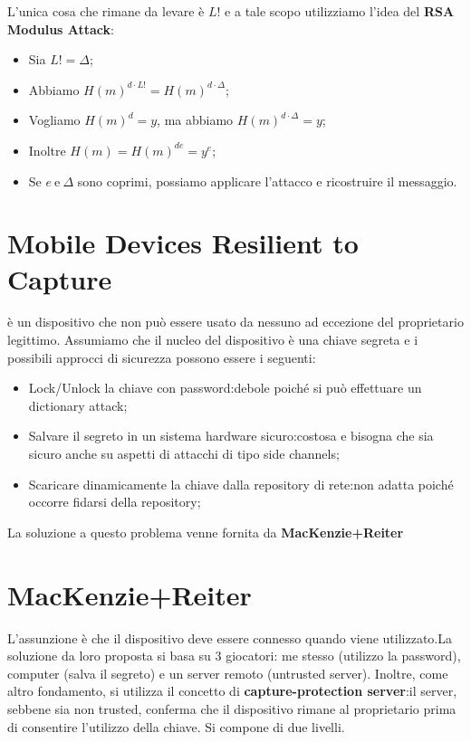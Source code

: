 \documentclass{book}
\begin{document}
L'unica cosa che rimane da levare è \(L! \) e a tale scopo utilizziamo l'idea del \textbf{RSA Modulus Attack}:\begin{itemize}
	\item Sia \(L! =\Delta \);
	\item Abbiamo \({H(m)}^{d\cdot L!}={H(m)}^{d\cdot \Delta}\);
	\item Vogliamo \({H(m)}^{d}=y\), ma abbiamo \({H(m)}^{d\cdot \Delta }=y\);
	\item Inoltre \(H(m)={H(m)}^{de}=y^{e}\);
	\item Se \(e\ \text{e}\ \Delta \) sono coprimi, possiamo applicare l'attacco e ricostruire il messaggio.
\end{itemize}
\section{Mobile Devices Resilient to Capture}
è un dispositivo che non può essere usato da nessuno ad eccezione del proprietario legittimo\@. Assumiamo che il nucleo del dispositivo è una chiave segreta e i possibili approcci di sicurezza possono essere i seguenti:\begin{itemize}
	\item Lock/Unlock la chiave con password:\@soluzione debole poiché si può effettuare un dictionary attack;
	\item Salvare il segreto in un sistema hardware sicuro:\@soluzione costosa e bisogna che sia sicuro anche su aspetti di attacchi di tipo side channels;
	\item Scaricare dinamicamente la chiave dalla repository di rete:\@soluzione non adatta poiché occorre fidarsi della repository;
\end{itemize}
La soluzione a questo problema venne fornita da \textbf{MacKenzie+Reiter}
\section{MacKenzie+Reiter}
L'assunzione è che il dispositivo deve essere connesso quando viene utilizzato\@.La soluzione da loro proposta si basa su 3 giocatori: me stesso (utilizzo la password), computer (salva il segreto) e un server remoto (untrusted server)\@. Inoltre, come altro fondamento, si utilizza il concetto di \textbf{capture-protection server}:il server, sebbene sia non trusted, conferma che il dispositivo rimane al proprietario prima di consentire l'utilizzo della chiave\@. Si compone di due livelli.
\end{document}
